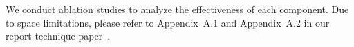 
We conduct ablation studies to analyze the effectiveness of each component. 
Due to space limitations, please refer to Appendix~A.1 and Appendix~A.2 in our report technique paper~\cite{Xu2026MRImaginTime}.


